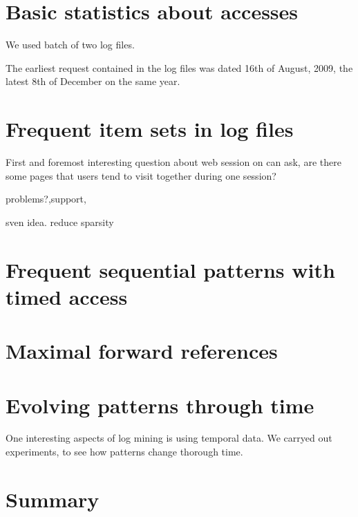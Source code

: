 \documentclass[english,a4paper]{article}
\begin{document}
\section{Basic statistics about accesses}
We used batch of two log files.

The earliest request contained in the log files was dated 16th of August, 2009, the latest 8th of December on the same year. 

\section{Frequent item sets in log files}
First and foremost interesting question about web session on can ask, are there some pages that users tend to visit together during one session?

problems?,support, 

sven idea. reduce sparsity


\section{Frequent sequential patterns with timed access}

\section{Maximal forward references}

\section{Evolving patterns through time}
One interesting aspects of log mining is using temporal data. We carryed out experiments, to see how patterns change thorough time.

\section{Summary}
\end{document}
